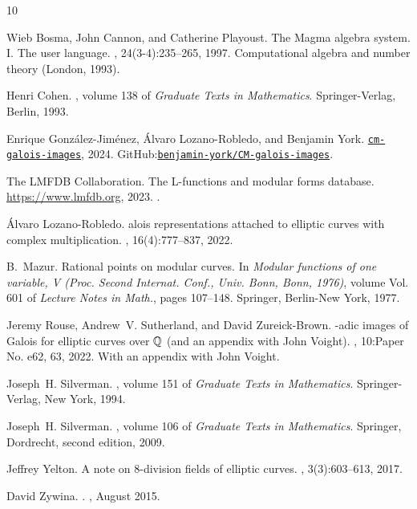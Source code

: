 \documentclass[11pt]{amsart}
\theoremstyle{definition}
\begin{document}
\begin{thebibliography}{10}

Wieb Bosma, John Cannon, and Catherine Playoust.
\newblock The {M}agma algebra system. {I}. {T}he user language.
, 24(3-4):235--265, 1997.
\newblock Computational algebra and number theory (London, 1993).

Henri Cohen.
, volume 138
  of {\em Graduate Texts in Mathematics}.
\newblock Springer-Verlag, Berlin, 1993.

Enrique Gonz\'alez-Jim\'enez, \'Alvaro Lozano-Robledo, and Benjamin York.
\newblock
  \href{https://github.com/benjamin-york/CM-galois-images}{\texttt{cm-galois-images}},
  2024.
\newblock
  GitHub:\href{https://github.com/benjamin-york/CM-galois-images}{\texttt{benjamin-york/CM-galois-images}}.

The {LMFDB Collaboration}.
\newblock The {L}-functions and modular forms database.
\newblock \url{https://www.lmfdb.org}, 2023.
.

\'Alvaro Lozano-Robledo.
alois representations attached to elliptic curves with complex
  multiplication.
, 16(4):777--837, 2022.

B.~Mazur.
\newblock Rational points on modular curves.
\newblock In {\em Modular functions of one variable, {V} ({P}roc. {S}econd
  {I}nternat. {C}onf., {U}niv. {B}onn, {B}onn, 1976)}, volume Vol. 601 of {\em
  Lecture Notes in Math.}, pages 107--148. Springer, Berlin-New York, 1977.

Jeremy Rouse, Andrew~V. Sutherland, and David Zureick-Brown.
\newblock {$\ell$}-adic images of {G}alois for elliptic curves over {$\Bbb{Q}$}
  (and an appendix with {J}ohn {V}oight).
, 10:Paper No. e62, 63, 2022.
\newblock With an appendix with John Voight.

Joseph~H. Silverman.
, volume
  151 of {\em Graduate Texts in Mathematics}.
\newblock Springer-Verlag, New York, 1994.

Joseph~H. Silverman.
, volume 106 of {\em Graduate
  Texts in Mathematics}.
\newblock Springer, Dordrecht, second edition, 2009.

Jeffrey Yelton.
\newblock A note on 8-division fields of elliptic curves.
, 3(3):603--613, 2017.

David {Zywina}.
.
, August 2015.

\end{thebibliography}
\end{document}
